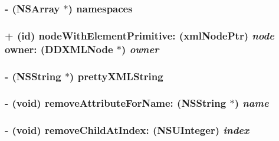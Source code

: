 \hypertarget{class_d_d_x_m_l_element_a84bb933cd340d685d22805f6dafce4b2}{
\subsubsection[{namespaces}]{\setlength{\rightskip}{0pt plus 5cm}-\/ (NSArray $\ast$) namespaces }}
\label{class_d_d_x_m_l_element_a84bb933cd340d685d22805f6dafce4b2}
\hypertarget{class_d_d_x_m_l_element_a3968eda63db8b6e150e0647440c6c42a}{
\subsubsection[{nodeWithElementPrimitive:owner:}]{\setlength{\rightskip}{0pt plus 5cm}+ (id) nodeWithElementPrimitive: (xmlNodePtr) {\em node}\/ owner: ({\bf DDXMLNode} $\ast$) {\em owner}}}
\label{class_d_d_x_m_l_element_a3968eda63db8b6e150e0647440c6c42a}
\hypertarget{class_d_d_x_m_l_element_ad95d131bbd82beba4f69e713ed4e11de}{
\subsubsection[{prettyXMLString}]{\setlength{\rightskip}{0pt plus 5cm}-\/ ({\bf NSString} $\ast$) prettyXMLString }}
\label{class_d_d_x_m_l_element_ad95d131bbd82beba4f69e713ed4e11de}
\hypertarget{class_d_d_x_m_l_element_ae8bb5b2fa01d039b3013afc16fe234e7}{
\subsubsection[{removeAttributeForName:}]{\setlength{\rightskip}{0pt plus 5cm}-\/ (void) removeAttributeForName: ({\bf NSString} $\ast$) {\em name}}}
\label{class_d_d_x_m_l_element_ae8bb5b2fa01d039b3013afc16fe234e7}
\hypertarget{class_d_d_x_m_l_element_aa6bc2079078c24d43cc95937ac3c04bd}{
\subsubsection[{removeChildAtIndex:}]{\setlength{\rightskip}{0pt plus 5cm}-\/ (void) removeChildAtIndex: (NSUInteger) {\em index}}}
